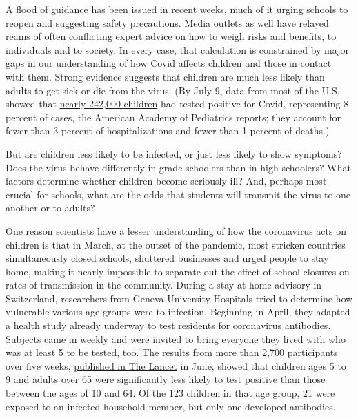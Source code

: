 A flood of guidance has been issued in recent weeks, much of it urging
schools to reopen and suggesting safety precautions. Media outlets as
well have relayed reams of often conflicting expert advice on how to
weigh risks and benefits, to individuals and to society. In every case,
that calculation is constrained by major gaps in our understanding of
how Covid affects children and those in contact with them. Strong
evidence suggests that children are much less likely than adults to get
sick or die from the virus. (By July 9, data from most of the U.S.
showed that
\href{https://services.aap.org/en/pages/2019-novel-coronavirus-covid-19-infections/children-and-covid-19-state-level-data-report/}{nearly
242,000 children} had tested positive for Covid, representing 8 percent
of cases, the American Academy of Pediatrics reports; they account for
fewer than 3 percent of hospitalizations and fewer than 1 percent of
deaths.)

But are children less likely to be infected, or just less likely to show
symptoms? Does the virus behave differently in grade-schoolers than in
high-schoolers? What factors determine whether children become seriously
ill? And, perhaps most crucial for schools, what are the odds that
students will transmit the virus to one another or to adults?

One reason scientists have a lesser understanding of how the coronavirus
acts on children is that in March, at the outset of the pandemic, most
stricken countries simultaneously closed schools, shuttered businesses
and urged people to stay home, making it nearly impossible to separate
out the effect of school closures on rates of transmission in the
community. During a stay-at-home advisory in Switzerland, researchers
from Geneva University Hospitals tried to determine how vulnerable
various age groups were to infection. Beginning in April, they adapted a
health study already underway to test residents for coronavirus
antibodies. Subjects came in weekly and were invited to bring everyone
they lived with who was at least 5 to be tested, too. The results from
more than 2,700 participants over five weeks,
\href{https://www.thelancet.com/journals/lancet/article/PIIS0140-6736(20)31304-0/fulltext}{published
in The Lancet} in June, showed that children ages 5 to 9 and adults over
65 were significantly less likely to test positive than those between
the ages of 10 and 64. Of the 123 children in that age group, 21 were
exposed to an infected household member, but only one developed
antibodies.

